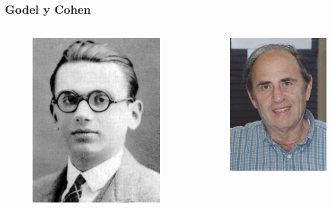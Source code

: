 \begin{frame}
\frametitle{Godel y Cohen}

\begin{columns}[c]

\begin{figure}
\includegraphics[width=0.7\linewidth]{IMGS/godel}
\end{figure}

\begin{figure}
\includegraphics[width=0.7\linewidth]{IMGS/cohen}
\end{figure}

\end{columns}
\end{frame}

